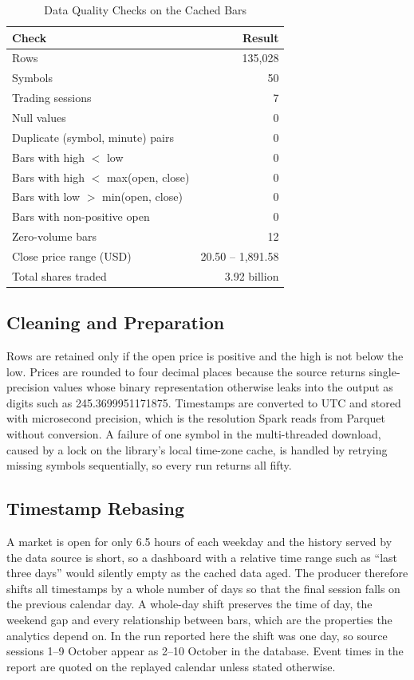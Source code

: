 \documentclass[conference]{IEEEtran}
\begin{document}
\begin{table}[t]
\caption{Data Quality Checks on the Cached Bars}
\label{tab:quality}
\centering
\small
\begin{tabular}{@{}lr@{}}
\toprule
Check & Result \\
\midrule
Rows & 135,028 \\
Symbols & 50 \\
Trading sessions & 7 \\
Null values & 0 \\
Duplicate (symbol, minute) pairs & 0 \\
Bars with high $<$ low & 0 \\
Bars with high $<$ max(open, close) & 0 \\
Bars with low $>$ min(open, close) & 0 \\
Bars with non-positive open & 0 \\
Zero-volume bars & 12 \\
Close price range (USD) & 20.50 -- 1,891.58 \\
Total shares traded & 3.92 billion \\
\bottomrule
\end{tabular}
\end{table}

\subsection{Cleaning and Preparation}
Rows are retained only if the open price is positive and the high is not below the low. Prices are rounded to four decimal places because the source returns single-precision values whose binary representation otherwise leaks into the output as digits such as 245.3699951171875. Timestamps are converted to UTC and stored with microsecond precision, which is the resolution Spark reads from Parquet without conversion. A failure of one symbol in the multi-threaded download, caused by a lock on the library's local time-zone cache, is handled by retrying missing symbols sequentially, so every run returns all fifty.

\subsection{Timestamp Rebasing}
A market is open for only 6.5 hours of each weekday and the history served by the data source is short, so a dashboard with a relative time range such as ``last three days'' would silently empty as the cached data aged. The producer therefore shifts all timestamps by a whole number of days so that the final session falls on the previous calendar day. A whole-day shift preserves the time of day, the weekend gap and every relationship between bars, which are the properties the analytics depend on. In the run reported here the shift was one day, so source sessions 1--9 October appear as 2--10 October in the database. Event times in the report are quoted on the replayed calendar unless stated otherwise.
\end{document}
